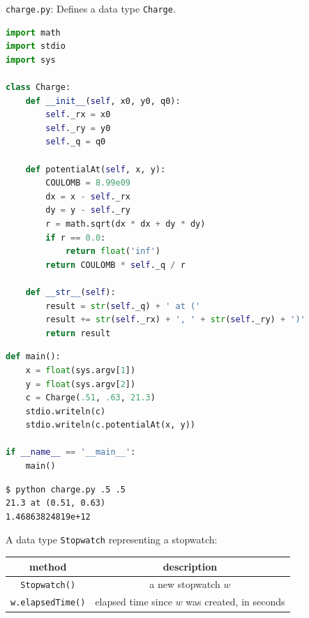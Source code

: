 \documentclass[8pt,a4paper,compress,handout]{beamer}
\begin{document}
\begin{frame}[fragile]
\begin{framed}
\tiny \lstinline{charge.py}: Defines a data type \lstinline{Charge}. 
\end{framed}

\begin{lstlisting}[language=Python]
import math
import stdio
import sys

class Charge:
    def __init__(self, x0, y0, q0):
        self._rx = x0
        self._ry = y0
        self._q = q0

    def potentialAt(self, x, y):
        COULOMB = 8.99e09
        dx = x - self._rx
        dy = y - self._ry
        r = math.sqrt(dx * dx + dy * dy)
        if r == 0.0:
            return float('inf')
        return COULOMB * self._q / r

    def __str__(self):
        result = str(self._q) + ' at ('
        result += str(self._rx) + ', ' + str(self._ry) + ')'
        return result
\end{lstlisting}
\end{frame}

\begin{frame}[fragile]
\begin{lstlisting}[language=Python]
def main():
    x = float(sys.argv[1])
    y = float(sys.argv[2])
    c = Charge(.51, .63, 21.3)
    stdio.writeln(c)
    stdio.writeln(c.potentialAt(x, y))

if __name__ == '__main__':
    main()
\end{lstlisting}

\begin{lstlisting}[language={}]
$ python charge.py .5 .5
21.3 at (0.51, 0.63)
1.46863824819e+12
\end{lstlisting}
\end{frame}

\begin{frame}[fragile]
A data type \lstinline{Stopwatch} representing a stopwatch:
\begin{center}
\begin{tabular}{cc}
method & description \\ \hline
\lstinline$Stopwatch()$ & a new stopwatch $w$ \\
\lstinline$w.elapsedTime()$ & elapsed time since $w$ was created, in seconds
\end{tabular} 
\end{center}
\end{frame}
\end{document}
